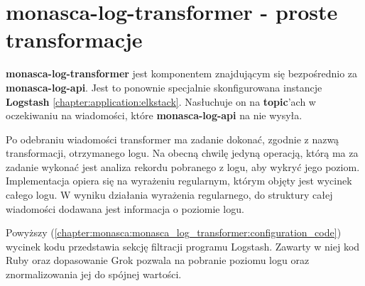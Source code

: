 \section{monasca-log-transformer - proste transformacje}
\label{chapter:monasca:monasca_log_transformer}

\textbf{monasca-log-transformer} jest komponentem znajdującym się bezpośrednio
za \textbf{monasca-log-api}. Jest to ponownie specjalnie skonfigurowana instancje
\textbf{Logstash} \ref{chapter:application:elkstack}. Nasłuchuje on na \textbf{topic}'ach w oczekiwaniu
na wiadomości, które \textbf{monasca-log-api} na nie wysyła. 

Po odebraniu wiadomości transformer ma zadanie dokonać, zgodnie z nazwą transformacji, otrzymanego 
logu. Na obecną chwilę jedyną operacją, którą ma za zadanie wykonać jest analiza rekordu pobranego z logu,
aby wykryć jego poziom. Implementacja opiera się na wyrażeniu regularnym, którym objęty jest wycinek
całego logu. W wyniku działania wyrażenia regularnego, do struktury całej wiadomości dodawana jest informacja
o poziomie logu. 


Powyższy (\ref{chapter:monasca:monasca_log_transformer:configuration_code}) wycinek kodu przedstawia
sekcję filtracji programu Logstash. Zawarty w niej kod Ruby oraz dopasowanie Grok pozwala na 
pobranie poziomu logu oraz znormalizowania jej do spójnej wartości. 